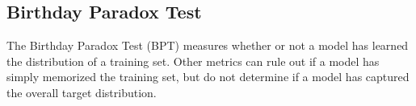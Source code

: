 \subsection{Birthday Paradox Test}
\label{sub:Birthday Paradox Test}

\begin{comment}
Probably needs a little more work.
Birthday Paradox Test \cite{arora2018gans} was created to measure whether or not the model had learned the distribution of the training set that the model was trained on. Other metrics are able to rule out if the model has simply memorized the training set but don't answer the question if the model has learned the wanted distribution. 

run the model to generate distribution(or images I think)
(a) Pick a sample Size s 
(b) The Birthday Paradox Text (BPT) looks at the closest(closest by similarity) 20 pairs.
(c) Visually inspect the 20 pairs to see if you be classified as duplicates by humans. (I think in the actual metric)
(d) Repeat a -c
If test says size s has duplicates with reasonable probability then the model has a support space size of s**2
Need A human to see if the pairs are in fact similiar?
Each dataset might need a different Heurstic Similarity Measure 
Doesn't work well with blurry images AKA won't work with gans that don't make sharp, realistic images.
\end{comment}

The Birthday Paradox Test \cite{arora2018gans} (BPT) measures whether or not a model has learned the distribution of a training set.
Other metrics can rule out if a model has simply memorized the training set, but do not determine if a model has captured the overall target distribution.

